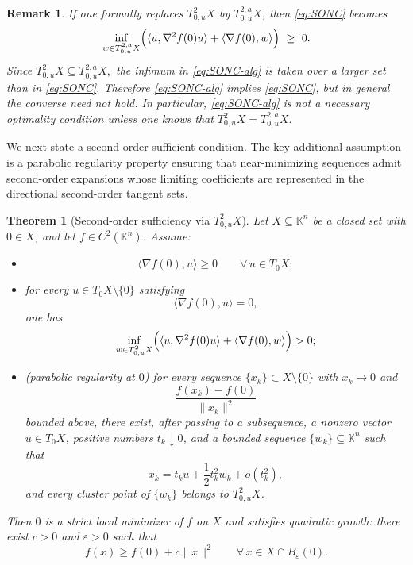\documentclass[10pt,reqno]{amsart}
\theoremstyle{break-italic}
\theoremstyle{break-italic}
\theoremstyle{break-italic}
\theoremstyle{break-italic}
\theoremstyle{break-italic}
\theoremstyle{break-italic}
\theoremstyle{break-italic}
\theoremstyle{break-italic}
\newtheorem{theorem}[satz]{Theorem}
\theoremstyle{break-roman}
\newtheorem{remark}[satz]{Remark}
\theoremstyle{standard}
\theoremstyle{varthm-roman}
\theoremstyle{varthm-italic}
\theoremstyle{varthm-roman-break}
\theoremstyle{varthm-italic-break}
\theoremstyle{varthm-roman-no-punctuation}
\theoremstyle{varthm-italic-no-punctuation}
\numberwithin{equation}{section}
\begin{document}
\begin{remark}\rm
If one formally replaces $T^2_{0,u}X$ by $T^{2,a}_{0,u}X$, then
\eqref{eq:SONC} becomes
\begin{equation}\label{eq:SONC-alg}
\inf_{w\in T^{2,a}_{0,u}X}
\Bigl(
\langle u,\nabla^2 f(0)u\rangle
+
\langle \nabla f(0),w\rangle
\Bigr)\ \ge\ 0 .
\end{equation}
Since
\(
T^2_{0,u}X\subseteq T^{2,a}_{0,u}X,
\)
the infimum in \eqref{eq:SONC-alg} is taken over a larger set than in
\eqref{eq:SONC}. Therefore \eqref{eq:SONC-alg} implies \eqref{eq:SONC}, but in
general the converse need not hold. In particular, \eqref{eq:SONC-alg} is not a
necessary optimality condition unless one knows that
\(
T^2_{0,u}X=T^{2,a}_{0,u}X.
\)
\end{remark}

We next state a second-order sufficient condition. The key additional assumption
is a parabolic regularity property ensuring that near-minimizing sequences admit
second-order expansions whose limiting coefficients are represented in the
directional second-order tangent sets.

\begin{theorem}[Second-order sufficiency via $T^2_{0,u}X$]
\label{thm:SOSC}
Let $X\subseteq\mathbb K^n$ be a closed set with $0\in X$, and let
$f\in C^2(\mathbb K^n)$. Assume:
\begin{itemize}
\item[(i)] 
\[
\langle \nabla f(0),u\rangle \ge 0
\qquad \forall\,u\in T_0X;
\]

\item[(ii)] for every $u\in T_0X\setminus\{0\}$ satisfying
\[
\langle \nabla f(0),u\rangle =0,
\]
one has
\begin{equation}\label{eq:SOSC-assump}
\inf_{w\in T^2_{0,u}X}
\Bigl(
\langle u,\nabla^2 f(0)u\rangle
+
\langle \nabla f(0),w\rangle
\Bigr)>0;
\end{equation}

\item[(iii)] \emph{(parabolic regularity at $0$)} for every sequence
$\{x_k\}\subset X\setminus\{0\}$ with $x_k\to 0$ and
\[
\frac{f(x_k)-f(0)}{\|x_k\|^2}
\]
bounded above, there exist, after passing to a subsequence,
a nonzero vector $u\in T_0X$, positive numbers $t_k\downarrow 0$, and a bounded
sequence $\{w_k\}\subseteq\mathbb K^n$ such that
\begin{equation}\label{eq:parabolic-expansion}
x_k=t_k u+\frac12 t_k^2w_k+o(t_k^2),
\end{equation}
and every cluster point of $\{w_k\}$ belongs to $T^2_{0,u}X$.
\end{itemize}
Then $0$ is a strict local minimizer of $f$ on $X$ and satisfies quadratic
growth: there exist $c>0$ and $\varepsilon>0$ such that
\[
f(x)\ge f(0)+c\|x\|^2
\qquad \forall\,x\in X\cap B_\varepsilon(0).
\]
\end{theorem}
\end{document}

